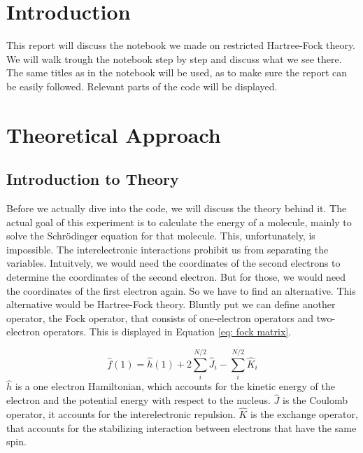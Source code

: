 \section{Introduction}
\label{sec:intro}
This report will discuss the notebook we made on restricted Hartree-Fock theory.
We will walk trough the notebook step by step and discuss what we see there. 
The same titles as in the notebook will be used, as to make sure the report can be 
easily followed. Relevant parts of the code will be displayed.

 \section{Theoretical Approach}
 \label{sec:theory}
 \subsection{Introduction to Theory}
 \label{subsec:intro}
 Before we actually dive into the code, we will discuss the theory behind it.
 The actual goal of this experiment is to calculate the energy of a molecule,
 mainly to solve the Schrödinger equation for that molecule. This, unfortunately,
is impossible. The interelectronic interactions prohibit us from separating the variables.
Intuitvely, we would need the coordinates of the second electrons to determine the
coordinates of the second electron. But for those, we would need the coordinates of
the first electron again. So we have to find an alternative. This alternative would be
Hartree-Fock theory. Bluntly put we can define another operator, the Fock operator,
that consists of one-electron operators and two-electron operators. This is 
displayed in Equation \ref{eq: fock matrix}. 

\begin{equation}\label{eq: fock matrix}
    \hat{f}(1) = \hat{h}(1) + 2\sum_i^{N/2}\hat{J}_i - \sum_i^{N/2}\hat{K}_i
\end{equation}
$\hat{h}$ is a one electron Hamiltonian, which accounts for the kinetic energy of
the electron and the potential energy with respect to the nucleus. $\hat{J}$ is the Coulomb operator, it accounts for the interelectronic repulsion. 
$\hat{K}$ is the exchange operator, that accounts for the stabilizing interaction between 
electrons that have the same spin. 
